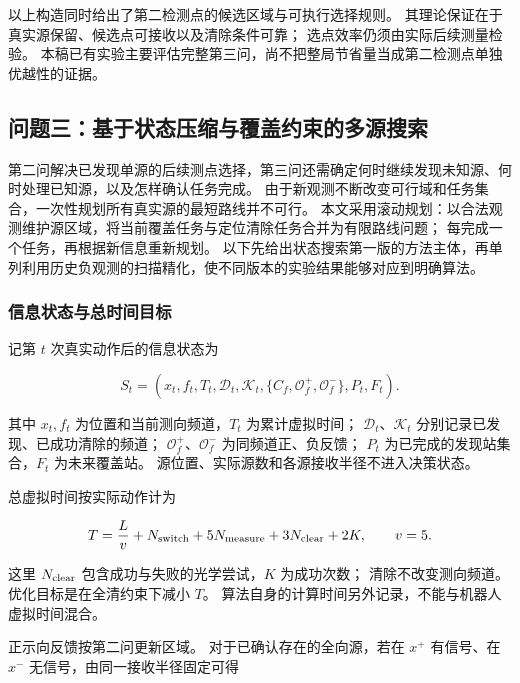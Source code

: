 \documentclass[UTF8,a4paper,zihao=5,fontset=fandol]{ctexart}
\begin{document}
以上构造同时给出了第二检测点的候选区域与可执行选择规则。
其理论保证在于真实源保留、候选点可接收以及清除条件可靠；
选点效率仍须由实际后续测量检验。
本稿已有实验主要评估完整第三问，尚不把整局节省量当成第二检测点单独优越性的证据。


\subsection{问题三：基于状态压缩与覆盖约束的多源搜索}\label{sec:q3}

第二问解决已发现单源的后续测点选择，第三问还需确定何时继续发现未知源、何时处理已知源，以及怎样确认任务完成。
由于新观测不断改变可行域和任务集合，一次性规划所有真实源的最短路线并不可行。
本文采用滚动规划：以合法观测维护源区域，将当前覆盖任务与定位清除任务合并为有限路线问题；
每完成一个任务，再根据新信息重新规划。
以下先给出状态搜索第一版的方法主体，再单列利用历史负观测的扫描精化，使不同版本的实验结果能够对应到明确算法。

\subsubsection{信息状态与总时间目标}\label{sec:q3-1}

记第 \(t\) 次真实动作后的信息状态为

\begin{equation}\label{eq:q3-1}
S_t=\left(x_t,f_t,T_t,\mathcal D_t,\mathcal K_t,
\{\widehat C_f,\mathcal O_f^+,\mathcal O_f^-\},P_t,F_t\right).
\end{equation}

其中 \(x_t,f_t\) 为位置和当前测向频道，\(T_t\) 为累计虚拟时间；
\(\mathcal D_t\)、\(\mathcal K_t\) 分别记录已发现、已成功清除的频道；
\(\mathcal O_f^+\)、\(\mathcal O_f^-\) 为同频道正、负反馈；
\(P_t\) 为已完成的发现站集合，\(F_t\) 为未来覆盖站。
源位置、实际源数和各源接收半径不进入决策状态。

总虚拟时间按实际动作计为

\begin{equation}\label{eq:q3-2}
T=\frac{L}{v}+N_{\rm switch}+5N_{\rm measure}
+3N_{\rm clear}+2K,\qquad v=5.
\end{equation}

这里 \(N_{\rm clear}\) 包含成功与失败的光学尝试，\(K\) 为成功次数；
清除不改变测向频道。
优化目标是在全清约束下减小 \(T\)。
算法自身的计算时间另外记录，不能与机器人虚拟时间混合。

正示向反馈按第二问更新区域。
对于已确认存在的全向源，若在 \(x^+\) 有信号、在 \(x^-\) 无信号，由同一接收半径固定可得
\end{document}
